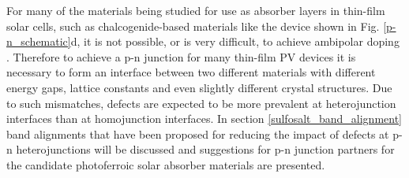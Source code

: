 \documentclass[11pt, twoside]{report}
\begin{document}
For many of the materials being studied for use as absorber layers in thin-film solar cells, such as chalcogenide-based materials like the device shown in Fig. \ref{p-n_schematic}d, it is not possible, or is very difficult, to achieve ambipolar doping \cite{band_alignment_review, Zhang_doping_limits}. Therefore to achieve a p-n junction for many thin-film PV devices it is necessary to form an interface between two different materials with different energy gaps, lattice constants and even slightly different crystal structures. Due to such mismatches, defects are expected to be more prevalent at heterojunction interfaces than at homojunction interfaces. In section \ref{sulfosalt_band_alignment} band alignments that have been proposed for reducing the impact of defects at p-n heterojunctions will be discussed and suggestions for p-n junction partners for the candidate photoferroic solar absorber materials are presented.
\end{document}
